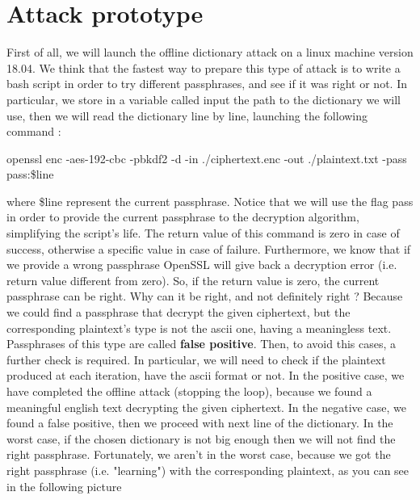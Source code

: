 \documentclass[11pt]{article}
\begin{document}
\section{Attack prototype}
First of all, we will launch the offline dictionary attack on a linux machine version 18.04. We think that the fastest way to prepare this type of attack is to write a bash script in order to try different passphrases, and see if it was right or not. In particular, we store in a variable called input the path to the dictionary we will use, then we will read the dictionary line by line, launching the following command :
\begin{center}
 openssl enc -aes-192-cbc -pbkdf2 -d -in ./ciphertext.enc -out ./plaintext.txt -pass pass:\$line
\end{center}
where \$line represent the current passphrase. Notice that we will use the flag pass in order to provide the current passphrase to the decryption algorithm, simplifying the script's life. The return value of this command is zero in case of success, otherwise a specific value in case of failure. Furthermore, we know that if we provide a wrong passphrase OpenSSL will give back a decryption error (i.e. return value different from zero). So, if the return value is zero, the current passphrase can be right. Why can it be right, and not definitely right ? Because we could find a passphrase that decrypt the given ciphertext, but the corresponding plaintext's type is not the ascii one, having a meaningless text. Passphrases of this type are called \textbf{false positive}. Then, to avoid this cases, a further check is required. In particular, we will need to check if the plaintext produced at each iteration, have the ascii format or not. In the positive case, we have completed the offline attack (stopping the loop), because we found a meaningful english text decrypting the given ciphertext. In the negative case, we found a false positive, then we proceed with next line of the dictionary. In the worst case, if the chosen dictionary is not big enough then we will not find the right passphrase. Fortunately, we aren't in the worst case, because we got the right passphrase (i.e. "learning") with the corresponding plaintext, as you can see in the following picture 
\end{document}
